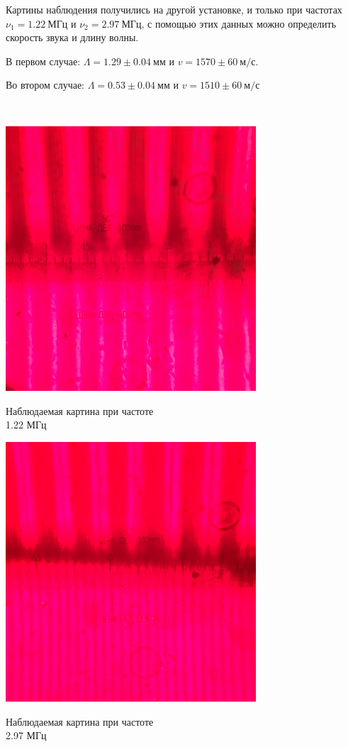 Картины наблюдения получились на другой установке, и только при частотах $\nu_1 = 1.22\ МГц$ и $\nu_2 = 2.97 \ МГц$, с помощью этих данных можно определить скорость звука и длину волны. 

В первом случае: $\Lambda = 1.29\pm0.04 \ мм$ и $v = 1570 \pm 60\ м/с$. 

Во втором случае: $\Lambda = 0.53\pm0.04 \ мм$ и $v = 1510 \pm 60\ м/с$

\

\newline


\begin{minipage}{0.47\textwidth}
\begin{center}
\includegraphics[width=0.7\textwidth]{1.jpg}
	
	Наблюдаемая картина при частоте\\ 1.22 МГц
\end{center}
\end{minipage}
\begin{minipage}{0.47\textwidth}
\begin{center}
\includegraphics[width=0.7\textwidth]{2.jpg}
	
	Наблюдаемая картина при частоте\\ 2.97 МГц
\end{center}
\end{minipage}

